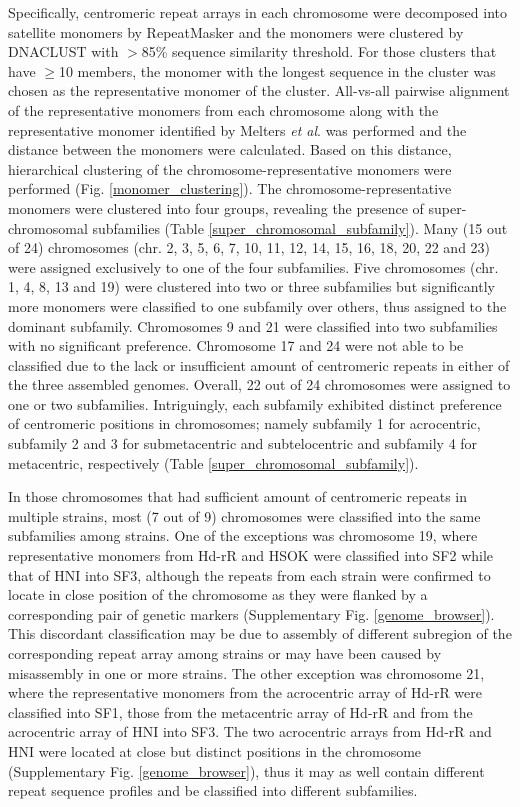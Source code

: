   Specifically, centromeric repeat arrays in each chromosome were decomposed into satellite monomers by RepeatMasker and the monomers were clustered by DNACLUST \cite{} with $>$85\% sequence similarity threshold. For those clusters that have $\geq$10 members, the monomer with the longest sequence in the cluster was chosen as the representative monomer of the cluster. All-vs-all pairwise alignment of the representative monomers from each chromosome along with the representative monomer identified by Melters \textit{et al}. was performed and the distance between the monomers were calculated. Based on this distance, hierarchical clustering of the chromosome-representative monomers were performed (Fig. \ref{monomer_clustering}). The chromosome-representative monomers were clustered into four groups, revealing the presence of super-chromosomal subfamilies (Table \ref{super_chromosomal_subfamily}). Many (15 out of 24) chromosomes (chr. 2, 3, 5, 6, 7, 10, 11, 12, 14, 15, 16, 18, 20, 22 and 23) were assigned exclusively to one of the four subfamilies. Five chromosomes (chr. 1, 4, 8, 13 and 19) were clustered into two or three subfamilies but significantly more monomers were classified to one subfamily over others, thus assigned to the dominant subfamily. Chromosomes 9 and 21 were classified into two subfamilies with no significant preference. Chromosome 17 and 24 were not able to be classified due to the lack or insufficient amount of centromeric repeats in either of the three assembled genomes. Overall, 22 out of 24 chromosomes were assigned to one or two subfamilies. Intriguingly, each subfamily exhibited distinct preference of centromeric positions in chromosomes; namely subfamily 1 for acrocentric, subfamily 2 and 3 for submetacentric and subtelocentric and subfamily 4 for metacentric, respectively (Table \ref{super_chromosomal_subfamily}).


  In those chromosomes that had sufficient amount of centromeric repeats in multiple strains, most (7 out of 9) chromosomes were classified into the same subfamilies among strains. One of the exceptions was chromosome 19, where representative monomers from Hd-rR and HSOK were classified into SF2 while that of HNI into SF3, although the repeats from each strain were confirmed to locate in close position of the chromosome as they were flanked by a corresponding pair of genetic markers (Supplementary Fig. \ref{genome_browser}). This discordant classification may be due to assembly of different subregion of the corresponding repeat array among strains or may have been caused by misassembly in one or more strains. The other exception was chromosome 21, where the representative monomers from the acrocentric array of Hd-rR were classified into SF1, those from the metacentric array of Hd-rR and from the acrocentric array of HNI into SF3. The two acrocentric arrays from Hd-rR and HNI were located at close but distinct positions in the chromosome (Supplementary Fig. \ref{genome_browser}), thus it may as well contain different repeat sequence profiles and be classified into different subfamilies.

